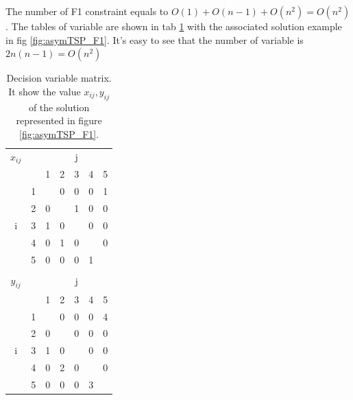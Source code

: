 The number of F1 constraint equals to $ O(1) + O(n-1) + O(n^2) = O(n^2) $. The tables of variable are shown in tab \ref{tab:asymTSP_F1_solution} with the associated solution example in fig \ref{fig:asymTSP_F1}. It's easy to see that the number of variable is $ 2n(n-1) = O(n^2) $\\


\begin{table}[h!]
	\begin{center}
		\caption{Decision variable matrix. It show the value $ x_{ij}, y_{ij} $ of the solution represented in figure \ref{fig:asymTSP_F1}.}
		\label{tab:asymTSP_F1_solution}
		\begin{tabular}{cc|c|c|c|c|c|}
			
$ x_{ij} $ & \multicolumn{1}{c}{} & \multicolumn{5}{c}{j} \\ %
& \multicolumn{1}{c}{} & \multicolumn{1}{c}{1} & \multicolumn{1}{c}{2} & \multicolumn{1}{c}{3} & \multicolumn{1}{c}{4} & \multicolumn{1}{c}{5} \\ \cline{3-7}
\multirow{5}{*}{i} 	& 1 & \cellcolor{Black} & 0 & 0 & 0 & 1 \\ \cline{3-7}
& 2 & 0 & \cellcolor{Black} & 1 & 0 & 0 \\ \cline{3-7}
& 3 & 1 & 0 & \cellcolor{Black} & 0 & 0 \\ \cline{3-7}
& 4 & 0 & 1 & 0 & \cellcolor{Black} & 0 \\ \cline{3-7}
& 5 & 0 & 0 & 0 & 1 & \cellcolor{Black} \\ \cline{3-7}
\multicolumn{7}{c}{} \\ 

$ y_{ij} $ & \multicolumn{1}{c}{} & \multicolumn{5}{c}{j} \\ %
& \multicolumn{1}{c}{} & \multicolumn{1}{c}{1} & \multicolumn{1}{c}{2} & \multicolumn{1}{c}{3} & \multicolumn{1}{c}{4} & \multicolumn{1}{c}{5} \\ \cline{3-7}
\multirow{5}{*}{i} 	& 1 & \cellcolor{Black} & 0 & 0 & 0 & 4 \\ \cline{3-7}
					& 2 & 0 & \cellcolor{Black} & 0 & 0 & 0 \\ \cline{3-7}
					& 3 & 1 & 0 & \cellcolor{Black} & 0 & 0 \\ \cline{3-7}
					& 4 & 0 & 2 & 0 & \cellcolor{Black} & 0 \\ \cline{3-7}
					& 5 & 0 & 0 & 0 & 3 & \cellcolor{Black} \\ \cline{3-7}
			
		\end{tabular}
	\end{center}
\end{table}